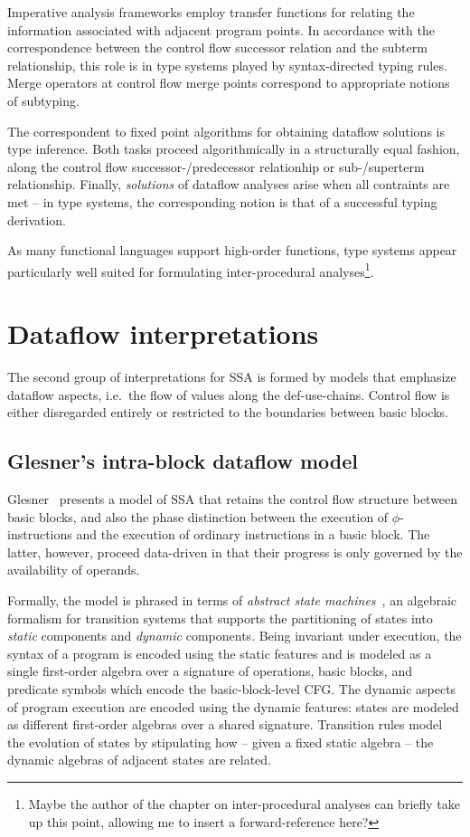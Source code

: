 Imperative analysis frameworks employ transfer functions for relating
the information associated with adjacent program points. In accordance
with the correspondence between the control flow successor relation and
the subterm relationship, this role is in type systems played by
syntax-directed typing rules. Merge operators at control flow merge
points correspond to appropriate notions of subtyping.

The correspondent to fixed point algorithms for obtaining dataflow
solutions is type inference. Both tasks proceed algorithmically in a
structurally equal fashion, along the control flow
successor-/predecessor relationhip or sub-/superterm relationship.
Finally, \emph{solutions} of dataflow analyses arise when
all contraints are met -- in type systems, the corresponding notion is
that of a successful typing derivation.

As many functional languages support high-order functions, type
systems appear particularly well suited for formulating
inter-procedural analyses\footnote{Maybe the author of the chapter on
inter-procedural analyses can briefly take up this point, allowing me
to insert a forward-reference here?}.

\section{Dataflow interpretations}
\label{section:Part1:Semantics:Dataflow}
The second group of interpretations for SSA is formed by models that
emphasize dataflow aspects, i.e.~the flow of values along the
def-use-chains. Control flow is either disregarded entirely or
restricted to the boundaries between basic blocks.

\subsection{Glesner's intra-block dataflow model}
Glesner~\cite{DBLP:conf/asm/Glesner04} presents a model of SSA that
retains the control flow structure between basic blocks, and also the
phase distinction between the execution of $\phi$-instructions and the
execution of ordinary instructions in a basic block. The latter,
however, proceed data-driven in that their progress is only governed
by the availability of operands.

Formally, the model is phrased in terms of \emph{abstract state
machines}~\cite{DBLP:journals/tocl/Gurevich00}, an algebraic formalism
for transition systems that supports the partitioning of states into
\emph{static} components and
\emph{dynamic} components. Being invariant under execution, the syntax
of a program is encoded using the static features and is modeled as a
single first-order algebra over a signature of operations, basic
blocks, and predicate symbols which encode the basic-block-level
CFG. The dynamic aspects of program execution are encoded using the
dynamic features: states are modeled as different first-order algebras
over a shared signature. Transition rules model the evolution of
states by stipulating how -- given a fixed static algebra -- the
dynamic algebras of adjacent states are related.

